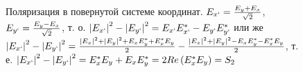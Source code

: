 \begin{figure}
\centering



\caption{Поляризация в повернутой системе координат.
  $E_{x`} = \frac{E_y + E_x}{\sqrt{2}}$,
  $E_{y`} = \frac{E_y - E_x}{\sqrt{2}}$, т. о.
  $
  \left|E_{x`}\right|^2 -  \left|E_{y`}\right|^2 =
  E_{x`}E_{x`}^\ast -  E_{y`}E_{y`}^\ast
  $
  или же
  $
  \left|E_{x`}\right|^2 -  \left|E_{y`}\right|^2
  = \frac{\left|E_x\right|^2 + \left|E_y\right|^2 + E_xE_y^\ast
    +E_x^\ast E_y }{2} -
  \frac{\left|E_x\right|^2 + \left|E_y\right|^2 - E_xE_y^\ast
    - E_x^\ast E_y }{2}
  $,
  т. е.
  $
  \left|E_{x`}\right|^2 -  \left|E_{y`}\right|^2
  = E_x^\ast E_y + E_xE_y^\ast = 2 Re\left(E_x^\ast E_y\right) = S_2
  $
}
\label{figPart3EntangS2}
\end{figure}
